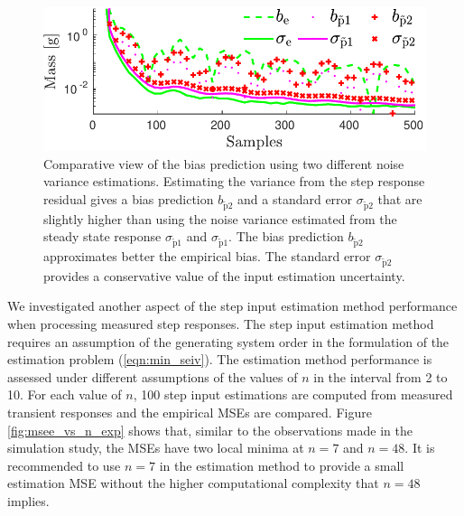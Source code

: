 \begin{figure}[!htb]
\centering
\includegraphics[width=1.0\columnwidth]{./ChapterExperimentalValidation/fig/Fig_11.pdf} 
\caption{ \label{fig:b_sigma_exp_str2} 
Comparative view of the bias prediction using two different noise variance estimations. 
Estimating the variance from the step response residual gives a bias prediction $b_{\widetilde{\mathrm{p}}2}$ and a standard error $\sigma_{\widetilde{\mathrm{p}}2}$ that are slightly higher than using the noise variance estimated from the steady state response $\sigma_{\widetilde{\mathrm{p}}1}$ and $\sigma_{\widetilde{\mathrm{p}}1}$. 
The bias prediction $b_{\widetilde{\mathrm{p}}2}$ approximates better the empirical bias. 
The standard error $\sigma_{\widetilde{\mathrm{p}}2}$ provides a conservative value of the input estimation uncertainty. }
\end{figure}


We investigated another aspect of the step input estimation method performance when processing measured step responses.
The step input estimation method requires an assumption of the generating system order in the formulation of the estimation problem (\ref{eqn:min_seiv}).
The estimation method performance is assessed under different assumptions of the values of $n$ in the interval from 2 to 10. 
For each value of $n$, 100 step input estimations are computed from measured transient responses and the empirical MSEs are compared.
Figure \ref{fig:msee_vs_n_exp} shows that, similar to the observations made in the simulation study, the MSEs have two local minima at $n=7$ and $n=48$.
It is recommended to use $n = 7$ in the estimation method to provide a small estimation MSE without the higher computational complexity that $n=48$ implies.


